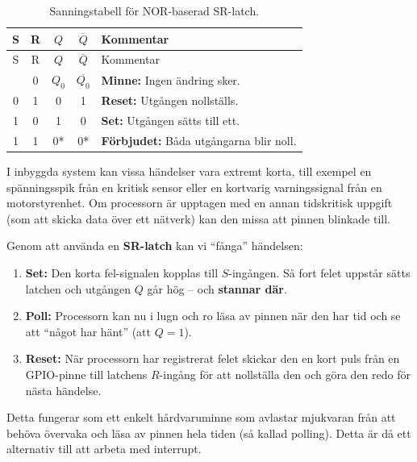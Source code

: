 \documentclass[
  swedish,
  letterpaper,
  oneside,
  openany]{book}
\providecommand{\tightlist}{%
  \setlength{\itemsep}{0pt}\setlength{\parskip}{0pt}}
\begin{document}
\begin{longtable}[]{@{}ccccl@{}}
\caption{Sanningstabell för NOR-baserad
SR-latch.}\label{tbl-SR-latch-NOR}\tabularnewline
\toprule\noalign{}
S & R & \(Q\) & \(\overline{Q}\) & Kommentar \\
\midrule\noalign{}
\endfirsthead
\toprule\noalign{}
S & R & \(Q\) & \(\overline{Q}\) & Kommentar \\
\midrule\noalign{}
\endhead
\bottomrule\noalign{}
\endlastfoot
0 & 0 & \(Q_0\) & \(\overline{Q_0}\) & \textbf{Minne:} Ingen ändring
sker. \\
0 & 1 & 0 & 1 & \textbf{Reset:} Utgången nollställs. \\
1 & 0 & 1 & 0 & \textbf{Set:} Utgången sätts till ett. \\
1 & 1 & 0* & 0* & \textbf{Förbjudet:} Båda utgångarna blir noll. \\
\end{longtable}

\begin{tcolorbox}[enhanced jigsaw, arc=.35mm, bottomrule=.15mm, bottomtitle=1mm, breakable, colback=white, colbacktitle=quarto-callout-note-color!10!white, colframe=quarto-callout-note-color-frame, coltitle=black, left=2mm, leftrule=.75mm, opacityback=0, opacitybacktitle=0.6, rightrule=.15mm, title=\textcolor{quarto-callout-note-color}{\faInfo}\hspace{0.5em}{Praktiskt exempel: Status-låsning (Event Capture)}, titlerule=0mm, toprule=.15mm, toptitle=1mm]

I inbyggda system kan vissa händelser vara extremt korta, till exempel
en spänningsspik från en kritisk sensor eller en kortvarig
varningssignal från en motorstyrenhet. Om processorn är upptagen med en
annan tidskritisk uppgift (som att skicka data över ett nätverk) kan den
missa att pinnen blinkade till.

Genom att använda en \textbf{SR-latch} kan vi ``fånga'' händelsen:

\begin{enumerate}
\def\labelenumi{\arabic{enumi}.}
\tightlist
\item
  \textbf{Set:} Den korta fel-signalen kopplas till \(S\)-ingången. Så
  fort felet uppstår sätts latchen och utgången \(Q\) går hög -- och
  \textbf{stannar där}.
\item
  \textbf{Poll:} Processorn kan nu i lugn och ro läsa av pinnen när den
  har tid och se att ``något har hänt'' (att \(Q=1\)).
\item
  \textbf{Reset:} När processorn har registrerat felet skickar den en
  kort puls från en GPIO-pinne till latchens \(R\)-ingång för att
  nollställa den och göra den redo för nästa händelse.
\end{enumerate}

Detta fungerar som ett enkelt hårdvaruminne som avlastar mjukvaran från
att behöva övervaka och läsa av pinnen hela tiden (så kallad polling).
Detta är då ett alternativ till att arbeta med interrupt.

\end{tcolorbox}
\end{document}
